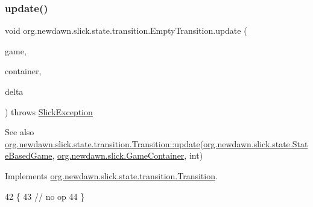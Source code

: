 \subsubsection{\texorpdfstring{update()}{update()}}
{\footnotesize\ttfamily void org.\+newdawn.\+slick.\+state.\+transition.\+Empty\+Transition.\+update (\begin{DoxyParamCaption}\item[{\mbox{\hyperlink{classorg_1_1newdawn_1_1slick_1_1state_1_1_state_based_game}{State\+Based\+Game}}}]{game,  }\item[{\mbox{\hyperlink{classorg_1_1newdawn_1_1slick_1_1_game_container}{Game\+Container}}}]{container,  }\item[{int}]{delta }\end{DoxyParamCaption}) throws \mbox{\hyperlink{classorg_1_1newdawn_1_1slick_1_1_slick_exception}{Slick\+Exception}}\hspace{0.3cm}{\ttfamily [inline]}}

\begin{DoxySeeAlso}{See also}
\mbox{\hyperlink{interfaceorg_1_1newdawn_1_1slick_1_1state_1_1transition_1_1_transition_a9be3072f6e2423e3d0a451a419d1d518}{org.\+newdawn.\+slick.\+state.\+transition.\+Transition\+::update}}(\mbox{\hyperlink{classorg_1_1newdawn_1_1slick_1_1state_1_1_state_based_game}{org.\+newdawn.\+slick.\+state.\+State\+Based\+Game}}, \mbox{\hyperlink{classorg_1_1newdawn_1_1slick_1_1_game_container}{org.\+newdawn.\+slick.\+Game\+Container}}, int) 
\end{DoxySeeAlso}


Implements \mbox{\hyperlink{interfaceorg_1_1newdawn_1_1slick_1_1state_1_1transition_1_1_transition_a9be3072f6e2423e3d0a451a419d1d518}{org.\+newdawn.\+slick.\+state.\+transition.\+Transition}}.


\begin{DoxyCode}
42                                                                                                       \{
43         \textcolor{comment}{// no op}
44     \}
\end{DoxyCode}
